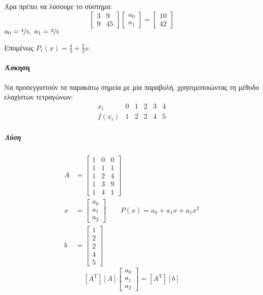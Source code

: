 \documentclass[11pt,a4paper,notitlepage,fleqn]{article}
\begin{document}
    Άρα πρέπει να λύσουμε το σύστημα:
    \[
    \left[\begin{matrix}
    3 & 9 \\ 9 & 45
    \end{matrix}\right] \left[\begin{matrix}
    a_0 \\ a_1
    \end{matrix}\right] = \left[\begin{matrix}
    10 \\ 42
    \end{matrix}\right]
    \]
    \( a_0 = \sfrac{4}{3},\ a_1 = \sfrac{2}{3}  \)
    
    Επομένως \( \displaystyle P_1(x) = \frac{4}{3} + \frac{2}{3}x \).
    
    \paragraph{Άσκηση}
    Να προσεγγιστούν τα παρακάτω σημεία με μία παραβολή, χρησιμοποιώντας
    τη μέθοδο ελαχίστων τετραγώνων:
    \[
    \begin{array}{r|ccccc}
    x_i & 0 & 1 & 2 & 3 & 4 \\ \hline
    f(x_i) & 1 & 2 & 2 & 4 & 5
    \end{array}
    \]

	\subparagraph{Λύση}
    \begin{align*}
    	A &= \left[\begin{matrix}
   	    1 & 0 & 0 \\ 1 & 1 & 1 \\ 1 & 2 & 4 \\ 1 & 3 & 9 \\ 1 & 4 & 1
    	\end{matrix}\right] \\
    	x &= \left[\begin{matrix}
    	a_0 \\ a_1 \\ a_2
    	\end{matrix}\right] \qquad P(x) = a_0+a_1x+a_1x^2 \\
    	b &= \left[
    	\begin{matrix}
    	1 \\ 2 \\ 2 \\ 4 \\ 5
    	\end{matrix}
    	\right]
    \end{align*}
    \[
    \left[
    A^{\mathrm T}
    \right] \left[ A \right]\left[
    \begin{matrix}
    a_0 \\ a_1 \\ a_2
    \end{matrix}
    \right] = \left[A^{\mathrm T}\right] \left[b\right]
    \]
\end{document}
